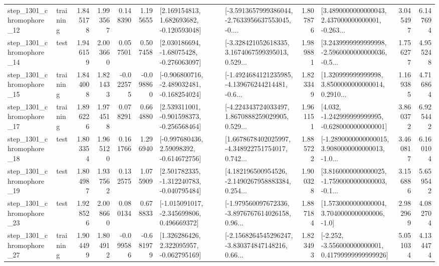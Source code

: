 \begin{tabular}{llrrrrllrlrr}
 step\_1301\_chromophore\_12 &  training &      1.845178 &    1.993567 &      0.148390 &  1.195655 &    [2.169154813, 1.682693682, -0.120593048] &  [-3.5913657999386044, -2.7633956637553045, -0.... &       1.807876 &  [3.4890000000000043, 2.437000000000001, -0.263... &            3.045497 &          6.147694 \\
 step\_1301\_chromophore\_14 &      test &      1.946159 &    2.003660 &      0.057501 &  0.507458 &    [2.030186694, -1.68075428, -0.276063097] &  [-3.328421052618335, 3.1674067599395013, 0.529... &       1.989881 &  [3.2439999999999998, -2.5960000000000036, -0.5... &            1.756277 &          4.955248 \\
 step\_1301\_chromophore\_15 &  training &      1.844008 &    1.821433 &     -0.022575 & -0.098860 &  [-0.906800716, -2.489032481, -0.168254024] &  [-1.4924684121235985, -4.139676244214481, -0.6... &       1.823349 &  [1.320999999999998, 3.8500000000000014, 0.2910... &            1.169385 &          4.716864 \\
 step\_1301\_chromophore\_17 &  training &      1.896226 &    1.974518 &      0.078291 &  0.664880 &   [2.539311001, -0.901598373, -0.256568464] &  [-4.224343724033497, 1.8670888259029905, 0.529... &       1.961151 &   [4.032, -1.242999999999995, -0.6280000000000001] &            3.860372 &          6.925442 \\
 step\_1301\_chromophore\_18 &      test &      1.803354 &    1.965120 &      0.161766 &  1.296940 &    [-0.997680436, 2.59098392, -0.614672756] &  [1.6678678402025997, -4.348922751754017, 0.742... &       1.885722 &  [-1.2890000000000015, 3.9080000000000013, -1.0... &            3.460817 &          6.160104 \\
 step\_1301\_chromophore\_19 &      test &      1.804987 &    1.937562 &      0.132575 &  1.075909 &   [2.501782335, -1.312240783, -0.040795484] &  [4.182196500954526, -2.1490267958883384, 0.254... &       1.900328 &  [3.8160000000000025, -1.7590000000000003, -0.1... &            3.156886 &          5.659542 \\
 step\_1301\_chromophore\_23 &      test &      1.928526 &    2.008660 &      0.080134 &  0.678833 &   [-1.015091017, -2.345699806, 0.496669372] &  [-1.979560097672336, -3.8976767614026158, 0.96... &       1.887184 &     [1.5730000000000004, 3.7040000000000006, -1.0] &            2.982969 &          4.082704 \\
 step\_1301\_chromophore\_27 &  training &      1.904499 &    1.804912 &     -0.099586 & -0.681979 &    [1.326286426, 2.322095957, -0.062795169] &  [-2.1568264545296247, -3.830374847148216, 0.66... &       1.823493 &  [-2.252, -3.556000000000001, 0.41799999999999926] &            5.051034 &          4.134474 \\

\end{tabular}
